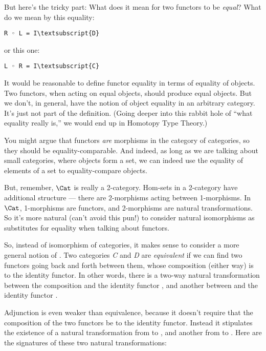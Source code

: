 \noindent
But here's the tricky part: What does it mean for two functors to be
\emph{equal}? What do we mean by this equality:

\begin{Verbatim}[commandchars=\\\{\}]
R ◦ L = I\textsubscript{D}
\end{Verbatim}
or this one:

\begin{Verbatim}[commandchars=\\\{\}]
L ◦ R = I\textsubscript{C}
\end{Verbatim}
It would be reasonable to define functor equality in terms of equality
of objects. Two functors, when acting on equal objects, should produce
equal objects. But we don't, in general, have the notion of object
equality in an arbitrary category. It's just not part of the definition.
(Going deeper into this rabbit hole of ``what equality really is,'' we
would end up in Homotopy Type Theory.)

You might argue that functors \emph{are} morphisms in the category of
categories, so they should be equality-comparable. And indeed, as long
as we are talking about small categories, where objects form a set, we
can indeed use the equality of elements of a set to equality-compare
objects.

But, remember, $\Cat$ is really a 2-category. Hom-sets in a
2-category have additional structure --- there are 2-morphisms acting
between 1-morphisms. In $\Cat$, 1-morphisms are functors, and
2-morphisms are natural transformations. So it's more natural (can't
avoid this pun!) to consider natural isomorphisms as substitutes for
equality when talking about functors.

So, instead of isomorphism of categories, it makes sense to consider a
more general notion of . Two categories \emph{C} and
\emph{D} are \emph{equivalent} if we can find two functors going back
and forth between them, whose composition (either way) is
 to the identity functor. In other words,
there is a two-way natural transformation between the composition
 and the identity functor , and another
between  and the identity functor .

Adjunction is even weaker than equivalence, because it doesn't require
that the composition of the two functors be  to the
identity functor. Instead it stipulates the existence of a  natural transformation from  to , and
another from  to . Here are the signatures of
these two natural transformations:

